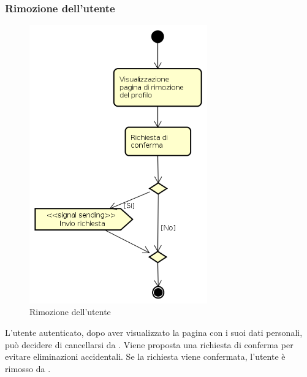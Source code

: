 \subsubsection{Rimozione dell'utente}
\begin{figure}[H]
\begin{center}
\includegraphics[height=12cm]{res/sections/backend/activities/rimuoviProfilo.png}
\caption{Rimozione dell'utente}
\end{center}
\end{figure}
L'utente autenticato, dopo aver visualizzato la pagina con i suoi dati personali, può decidere di cancellarsi da . Viene proposta una richiesta di conferma per evitare eliminazioni accidentali. Se la richiesta viene confermata, l'utente è rimosso da .

